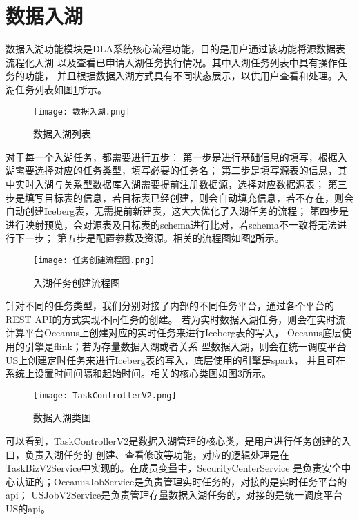 \section{数据入湖}

数据入湖功能模块是DLA系统核心流程功能，目的是用户通过该功能将源数据表流程化入湖
以及查看已申请入湖任务执行情况。其中入湖任务列表中具有操作任务的功能，
并且根据数据入湖方式具有不同状态展示，以供用户查看和处理。入湖任务列表如图\ref{fig:数据入湖}所示。

\begin{figure}[H]
  \centering
  \texttt{[image: 数据入湖.png]}
  \caption{数据入湖列表}
  \label{fig:数据入湖}
\end{figure}

对于每一个入湖任务，都需要进行五步：
第一步是进行基础信息的填写，根据入湖需要选择对应的任务类型，填写必要的任务名；
第二步是填写源表的信息，其中实时入湖与关系型数据库入湖需要提前注册数据源，选择对应数据源表；
第三步是填写目标表的信息，若目标表已经创建，则会自动填充信息，若不存在，则会自动创建Iceberg表，无需提前新建表，这大大优化了入湖任务的流程；
第四步是进行映射预览，会对源表及目标表的schema进行比对，若schema不一致将无法进行下一步；
第五步是配置参数及资源。相关的流程图如图\ref{fig:任务创建流程图}所示。

\begin{figure}[H]
  \centering
  \texttt{[image: 任务创建流程图.png]}
  \caption{入湖任务创建流程图}
  \label{fig:任务创建流程图}
\end{figure}

针对不同的任务类型，我们分别对接了内部的不同任务平台，通过各个平台的REST API的方式实现不同任务的创建。
若为实时数据入湖任务，则会在实时流计算平台Oceanus上创建对应的实时任务来进行Iceberg表的写入，
Oceanus底层使用的引擎是flink；若为存量数据入湖或者关系
型数据入湖，则会在统一调度平台US上创建定时任务来进行Iceberg表的写入，底层使用的引擎是spark，
并且可在系统上设置时间间隔和起始时间。相关的核心类图如图\ref{fig:TaskControllerV2}所示。

\begin{figure}[H]
  \centering
  \texttt{[image: TaskControllerV2.png]}
  \caption{数据入湖类图}
  \label{fig:TaskControllerV2}
\end{figure}

可以看到，TaskControllerV2是数据入湖管理的核心类，是用户进行任务创建的入口，负责入湖任务的
创建、查看修改等功能，对应的逻辑处理是在TaskBizV2Service中实现的。在成员变量中，SecurityCenterService
是负责安全中心认证的；OceanusJobService是负责管理实时任务的，对接的是实时任务平台的api；
USJobV2Service是负责管理存量数据入湖任务的，对接的是统一调度平台US的api。

